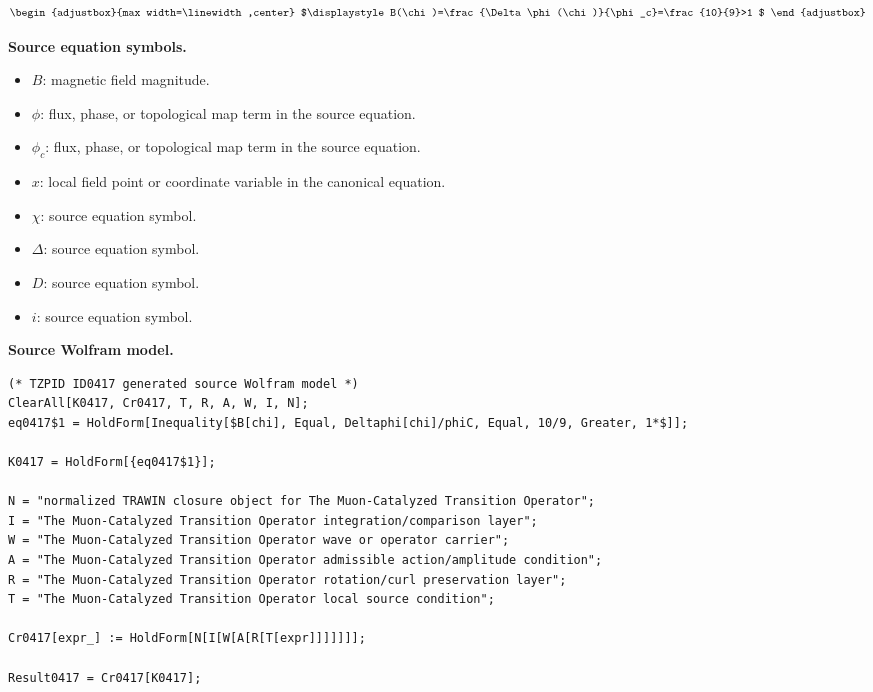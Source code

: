 \[
\begin{adjustbox}{max width=\linewidth,center}
$\displaystyle
B(\chi)=\frac{\Delta\phi(\chi)}{\phi_c}=\frac{10}{9}>1
$
\end{adjustbox}
\]

\begin{minipage}[t]{0.49\linewidth}
\begingroup
\small
\raggedright
\textbf{Source equation symbols.}\par
\begin{itemize}[leftmargin=1.35em,itemsep=1pt,topsep=1pt,parsep=0pt]
    \item $B$: magnetic field magnitude.
    \item $\phi$: flux, phase, or topological map term in the source equation.
    \item $\phi_c$: flux, phase, or topological map term in the source equation.
    \item $x$: local field point or coordinate variable in the canonical equation.
    \item $\chi$: source equation symbol.
    \item $\Delta$: source equation symbol.
    \item $D$: source equation symbol.
    \item $i$: source equation symbol.
\end{itemize}
\endgroup
\end{minipage}\hfill
\begin{minipage}[t]{0.47\linewidth}
\begingroup
\scriptsize
\raggedright
\textbf{Source Wolfram model.}\par
\begin{Verbatim}[fontsize=\tiny,breaklines=true,breakanywhere=true]
(* TZPID ID0417 generated source Wolfram model *)
ClearAll[K0417, Cr0417, T, R, A, W, I, N];
eq0417$1 = HoldForm[Inequality[$B[chi], Equal, Deltaphi[chi]/phiC, Equal, 10/9, Greater, 1*$]];

K0417 = HoldForm[{eq0417$1}];

N = "normalized TRAWIN closure object for The Muon-Catalyzed Transition Operator";
I = "The Muon-Catalyzed Transition Operator integration/comparison layer";
W = "The Muon-Catalyzed Transition Operator wave or operator carrier";
A = "The Muon-Catalyzed Transition Operator admissible action/amplitude condition";
R = "The Muon-Catalyzed Transition Operator rotation/curl preservation layer";
T = "The Muon-Catalyzed Transition Operator local source condition";

Cr0417[expr_] := HoldForm[N[I[W[A[R[T[expr]]]]]]];

Result0417 = Cr0417[K0417];
\end{Verbatim}
\endgroup
\end{minipage}

